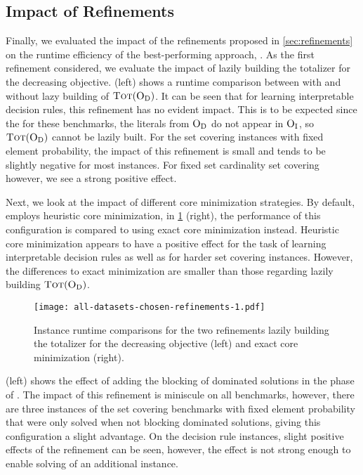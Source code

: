 \subsection{Impact of Refinements}

Finally, we evaluated the impact of the refinements proposed in \cref{sec:refinements} on the runtime efficiency of the best-performing approach, \msh{}.
As the first refinement considered, we evaluate the impact of lazily building the totalizer for the decreasing objective.
 (left) shows a runtime comparison between \msh{} with and without lazy building of $\textsc{Tot}(\textsc{O}_{\text{D}})$.
It can be seen that for learning interpretable decision rules, this refinement has no evident impact.
This is to be expected since the for these benchmarks, the literals from $\textsc{O}_{\text{D}}$ do not appear in $\textsc{O}_{\text{I}}$, so $\textsc{Tot}(\textsc{O}_{\text{D}})$ cannot be lazily built.
For the set covering instances with fixed element probability, the impact of this refinement is small and tends to be slightly negative for most instances.
For fixed set cardinality set covering however, we see a strong positive effect.

Next, we look at the impact of different core minimization strategies.
By default, \msh{} employs heuristic core minimization, in \cref{fig:refinements-1} (right), the performance of this configuration is compared to using exact core minimization instead.
Heuristic core minimization appears to have a positive effect for the task of learning interpretable decision rules as well as for harder set covering instances.
However, the differences to exact minimization are smaller than those regarding lazily building $\textsc{Tot}(\textsc{O}_{\text{D}})$.

\begin{figure}
    \centering
    \texttt{[image: all-datasets-chosen-refinements-1.pdf]}
    \caption{Instance runtime comparisons for the two refinements lazily building the totalizer for the decreasing objective (left) and exact core minimization (right).}\label{fig:refinements-1}
\end{figure}

 (left) shows the effect of adding the blocking of dominated solutions in the \satunsat{} phase of \msh{}.
The impact of this refinement is miniscule on all benchmarks, however, there are three instances of the set covering benchmarks with fixed element probability that were only solved when not blocking dominated solutions, giving this configuration a slight advantage.
On the decision rule instances, slight positive effects of the refinement can be seen, however, the effect is not strong enough to enable solving of an additional instance.

